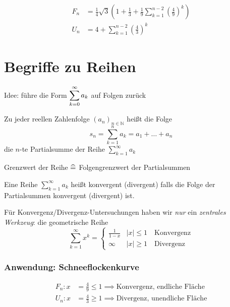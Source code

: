 \begin{align*}
    F_n &= \frac{1}{4} \sqrt{3} \left( 1 + \frac{1}{3} + \frac{1}{9} \sum_{k=1}^{n-2} \left( \frac{4}{9} \right)^k \right) \\
    U_n &= 4 + \sum_{k=1}^{n-2} \left( \frac{4}{3} \right)^k
\end{align*}

\section{Begriffe zu Reihen}

Idee: führe die Form $\displaystyle\sum_{k=0}^{\infty} a_k$ auf Folgen zurück

\begin{definition}[Partialsumme] Zu jeder reellen Zahlenfolge $(a_n)_{n \in \mathbb{N}}$ heißt die Folge
\begin{equation*}
    s_n = \sum_{k=1}^n a_k = a_1 + \dots + a_n
\end{equation*}
die $n$-te Partialsumme der Reihe $\sum_{k=1}^{\infty} a_k$
\end{definition}

\noindent Grenzwert der Reihe $\mathrel{\widehat{=}}$ Folgengrenzwert der Partialsummen

\begin{definition}
Eine Reihe $\sum_{k=1}^{\infty} a_k$ heißt konvergent (divergent) falls die Folge der Partialsummen konvergent (divergent) ist.
\end{definition}

\noindent Für Konvergenz/Divergenz-Untersuchungen haben wir \emph{nur} ein \emph{zentrales Werkzeug}: die geometrische Reihe
\begin{equation*}
    \sum_{k=1}^{\infty} x^k =
    \begin{cases}
        \frac{1}{1-x} & |x| \le 1 \quad\text{Konvergenz}\\
        \infty & |x| \geq 1 \quad\text{Divergenz}
    \end{cases}
\end{equation*}

\subsubsection*{Anwendung: Schneeflockenkurve}
\begin{align*}
    F_n: x &= \frac{4}{9} \le 1 \implies \text{Konvergenz, endliche Fläche} \\
    U_n: x &= \frac{4}{3} \ge 1 \implies \text{Divergenz, unendliche Fläche}
\end{align*}

